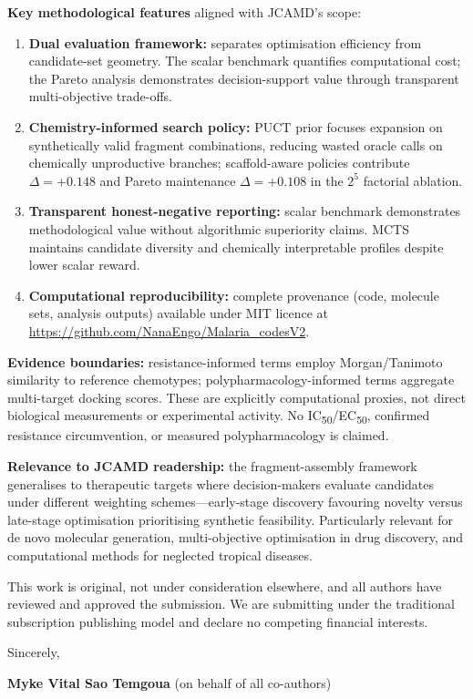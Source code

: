 \documentclass[9pt,letterpaper]{article}
\begin{document}
\noindent\textbf{Key methodological features} aligned with JCAMD's scope:

\begin{enumerate}
\item \textbf{Dual evaluation framework:} separates optimisation efficiency from candidate-set geometry. The scalar benchmark quantifies computational cost; the Pareto analysis demonstrates decision-support value through transparent multi-objective trade-offs.

\item \textbf{Chemistry-informed search policy:} PUCT prior focuses expansion on synthetically valid fragment combinations, reducing wasted oracle calls on chemically unproductive branches; scaffold-aware policies contribute $\Delta = +0.148$ and Pareto maintenance $\Delta = +0.108$ in the $2^5$ factorial ablation.

\item \textbf{Transparent honest-negative reporting:} scalar benchmark demonstrates methodological value without algorithmic superiority claims. MCTS maintains candidate diversity and chemically interpretable profiles despite lower scalar reward.

\item \textbf{Computational reproducibility:} complete provenance (code, molecule sets, analysis outputs) available under MIT licence at \url{https://github.com/NanaEngo/Malaria_codesV2}.
\end{enumerate}

\noindent\textbf{Evidence boundaries:} resistance-informed terms employ Morgan/Tanimoto similarity to reference chemotypes; polypharmacology-informed terms aggregate multi-target docking scores. These are explicitly computational proxies, not direct biological measurements or experimental activity. No IC\textsubscript{50}/EC\textsubscript{50}, confirmed resistance circumvention, or measured polypharmacology is claimed.

\noindent\textbf{Relevance to JCAMD readership:} the fragment-assembly framework generalises to therapeutic targets where decision-makers evaluate candidates under different weighting schemes—early-stage discovery favouring novelty versus late-stage optimisation prioritising synthetic feasibility. Particularly relevant for de novo molecular generation, multi-objective optimisation in drug discovery, and computational methods for neglected tropical diseases.

This work is original, not under consideration elsewhere, and all authors have reviewed and approved the submission. We are submitting under the traditional subscription publishing model and declare no competing financial interests.

\vspace{0.3em}

\noindent Sincerely,

\noindent \textbf{Myke Vital Sao Temgoua} (on behalf of all co-authors)
\end{document}
